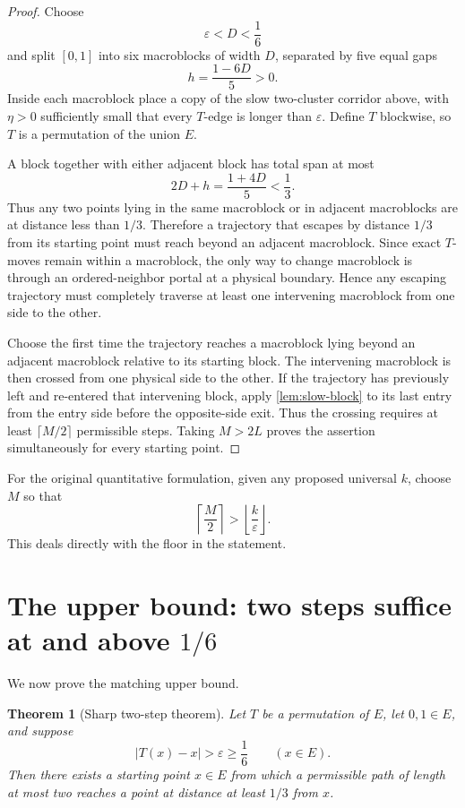 \documentclass[11pt]{article}
\newtheorem{theorem}{Theorem}[section]
\newcommand{\eps}{\varepsilon}
\begin{document}
\begin{proof}
Choose
\[
\eps<D<\frac16
\]
and split $[0,1]$ into six macroblocks of width $D$, separated by five equal gaps
\[
h=\frac{1-6D}{5}>0.
\]
Inside each macroblock place a copy of the slow two-cluster corridor above, with $\eta>0$ sufficiently small that every $T$-edge is longer than $\eps$. Define $T$ blockwise, so $T$ is a permutation of the union $E$.

A block together with either adjacent block has total span at most
\[
2D+h
=
\frac{1+4D}{5}
<\frac13.
\]
Thus any two points lying in the same macroblock or in adjacent macroblocks are at distance less than $1/3$. Therefore a trajectory that escapes by distance $1/3$ from its starting point must reach beyond an adjacent macroblock. Since exact $T$-moves remain within a macroblock, the only way to change macroblock is through an ordered-neighbor portal at a physical boundary. Hence any escaping trajectory must completely traverse at least one intervening macroblock from one side to the other.

Choose the first time the trajectory reaches a macroblock lying beyond an adjacent macroblock relative to its starting block. The intervening macroblock is then crossed from one physical side to the other. If the trajectory has previously left and re-entered that intervening block, apply \cref{lem:slow-block} to its last entry from the entry side before the opposite-side exit. Thus the crossing requires at least $\lceil M/2\rceil$ permissible steps. Taking $M>2L$ proves the assertion simultaneously for every starting point.
\end{proof}

For the original quantitative formulation, given any proposed universal $k$, choose $M$ so that
\[
\left\lceil\frac M2\right\rceil
>
\left\lfloor\frac{k}{\eps}\right\rfloor.
\]
This deals directly with the floor in the statement.

\section{The upper bound: two steps suffice at and above $1/6$}

We now prove the matching upper bound.

\begin{theorem}[Sharp two-step theorem]\label{thm:two-step}
Let $T$ be a permutation of $E$, let $0,1\in E$, and suppose
\[
|T(x)-x|>\eps\ge\frac16
\qquad(x\in E).
\]
Then there exists a starting point $x\in E$ from which a permissible path of length at most two reaches a point at distance at least $1/3$ from $x$.
\end{theorem}
\end{document}

